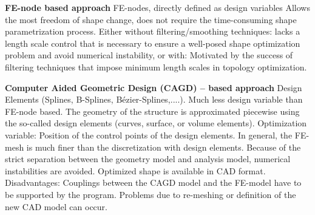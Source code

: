 \textbf{FE-node based approach}
FE-nodes, directly defined as design variables
Allows the most freedom of shape change, does not require the time-consuming shape parametrization process.
Either without filtering/smoothing techniques:  lacks a length scale control that is necessary to ensure a well-posed shape optimization problem and avoid numerical instability, or with: Motivated by the success of filtering techniques that impose minimum length scales in topology optimization.

\textbf{Computer Aided Geometric Design (CAGD) – based approach}
Design Elements (Splines, B-Splines, Bézier-Splines,....). Much less design variable than FE-node based.
The geometry of the structure is approximated piecewise using the so-called design elements (curves, surface, or volume elements).
Optimization variable: Position of the control points of the design elements. 
In general, the FE-mesh is much finer than the discretization with design elements. 
Because of the strict separation between the geometry model and analysis model, numerical instabilities are avoided.
Optimized shape is available in CAD format. Disadvantages:
Couplings between the CAGD model and the FE-model have to be supported by the program.
Problems due to re-meshing or definition of the new CAD model can occur.

